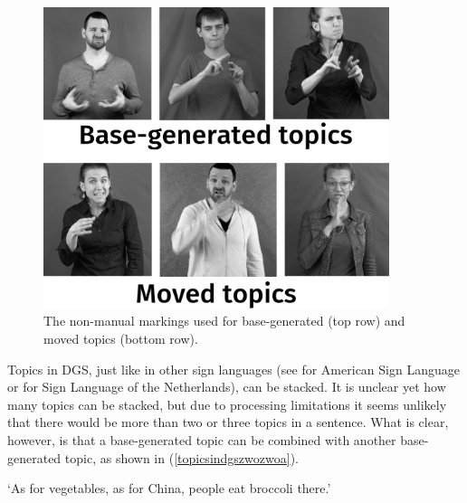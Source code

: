 \begin{figure}[bt]
\centering
	\includegraphics[width=0.9\textwidth]{topicsdgs2sw.jpg}
	\caption{The non-manual markings used for base-generated (top row) and moved topics (bottom row).}
	\label{topicsindgspicture}
\end{figure}

Topics in DGS, just like in other sign languages (see \citealt{aarons1994aspects} for American Sign Language or \citealt{pfau2008topics} for Sign Language of the Netherlands), can be stacked. It is unclear yet how many topics can be stacked, but due to processing limitations it seems unlikely that there would be more than two or three topics in a sentence. What is clear, however, is that a base-generated topic can be combined with another base-generated topic, as shown in (\ref{topicsindgszwozwoa}).

\begin{exe}
\ex {}  
\glt `As for vegetables, as for China, people eat broccoli there.' \label{topicsindgszwozwoa} 
\end{exe}

